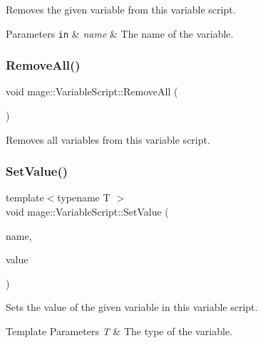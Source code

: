 Removes the given variable from this variable script.


\begin{DoxyParams}[1]{Parameters}
\mbox{\tt in}  & {\em name} & The name of the variable. \\
\hline
\end{DoxyParams}
\mbox{\label{classmage_1_1_variable_script_add51955d83e85e6d6acd82cfe40bed26}} 
\subsubsection{\texorpdfstring{Remove\+All()}{RemoveAll()}}
{\footnotesize\ttfamily void mage\+::\+Variable\+Script\+::\+Remove\+All (\begin{DoxyParamCaption}{ }\end{DoxyParamCaption})\hspace{0.3cm}{\ttfamily [noexcept]}}

Removes all variables from this variable script. \mbox{\label{classmage_1_1_variable_script_abf23e2fd9c2344405cb8c9e3b44af62c}} 
\subsubsection{\texorpdfstring{Set\+Value()}{SetValue()}}
{\footnotesize\ttfamily template$<$typename T $>$ \\
void mage\+::\+Variable\+Script\+::\+Set\+Value (\begin{DoxyParamCaption}\item[{std\+::string\+\_\+view}]{name,  }\item[{T}]{value }\end{DoxyParamCaption})}

Sets the value of the given variable in this variable script.


\begin{DoxyTemplParams}{Template Parameters}
{\em T} & The type of the variable. \\
\hline
\end{DoxyTemplParams}

